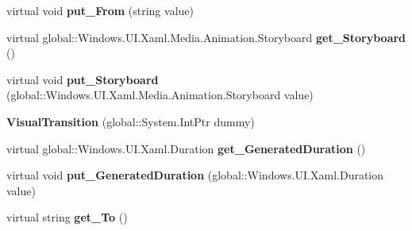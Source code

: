 \begin{DoxyCompactItemize}
\item 
\mbox{\label{class_windows_1_1_u_i_1_1_xaml_1_1_visual_transition_af379d21f8a469ce2c38b93f7b387d5f3}} 
virtual void {\bfseries put\+\_\+\+From} (string value)
\item 
\mbox{\label{class_windows_1_1_u_i_1_1_xaml_1_1_visual_transition_ad0e85cd4965feb0bae3084eee6e188dc}} 
virtual global\+::\+Windows.\+U\+I.\+Xaml.\+Media.\+Animation.\+Storyboard {\bfseries get\+\_\+\+Storyboard} ()
\item 
\mbox{\label{class_windows_1_1_u_i_1_1_xaml_1_1_visual_transition_a84345f3db3f81606783b0b0f12f011dd}} 
virtual void {\bfseries put\+\_\+\+Storyboard} (global\+::\+Windows.\+U\+I.\+Xaml.\+Media.\+Animation.\+Storyboard value)
\item 
\mbox{\label{class_windows_1_1_u_i_1_1_xaml_1_1_visual_transition_a8e9584c6562711665f737ddc44600c07}} 
{\bfseries Visual\+Transition} (global\+::\+System.\+Int\+Ptr dummy)
\item 
\mbox{\label{class_windows_1_1_u_i_1_1_xaml_1_1_visual_transition_afb0659e34cd42d916c1086d04558a288}} 
virtual global\+::\+Windows.\+U\+I.\+Xaml.\+Duration {\bfseries get\+\_\+\+Generated\+Duration} ()
\item 
\mbox{\label{class_windows_1_1_u_i_1_1_xaml_1_1_visual_transition_a9425580c95693c7ee3d33464e68ce83f}} 
virtual void {\bfseries put\+\_\+\+Generated\+Duration} (global\+::\+Windows.\+U\+I.\+Xaml.\+Duration value)
\item 
\mbox{\label{class_windows_1_1_u_i_1_1_xaml_1_1_visual_transition_a0b343e8c15ba3f404cb2f2152e2af0fb}} 
virtual string {\bfseries get\+\_\+\+To} ()
\item 
\mbox{\label{class_windows_1_1_u_i_1_1_xaml_1_1_visual_transition_aa76ac64a1c186e375fd07fbef846cefd}} 

\end{DoxyCompactItemize}
